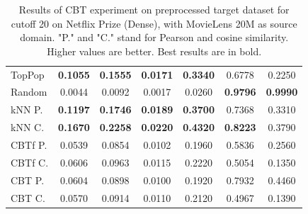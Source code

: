 \begin{table}[hbt]
\begin{tabulary}{\textwidth}{|L|CCCCCC|}
TopPop & \textbf{0.1055} & \textbf{0.1555} & \textbf{0.0171} & \textbf{0.3340} & 0.6778 & 0.2250 \\
Random & 0.0044 & 0.0092 & 0.0017 & 0.0260 & \textbf{0.9796} & \textbf{0.9990} \\
kNN P. & \textbf{0.1197} & \textbf{0.1746} & \textbf{0.0189} & \textbf{0.3700} & 0.7368 & 0.3310 \\
kNN C. & \textbf{0.1670} & \textbf{0.2258} & \textbf{0.0220} & \textbf{0.4320} & \textbf{0.8223} & 0.3790 \\
CBTf P. & 0.0539 & 0.0854 & 0.0102 & 0.1960 & 0.5836 & 0.2560 \\
CBTf C. & 0.0606 & 0.0963 & 0.0115 & 0.2220 & 0.5054 & 0.1350 \\
CBT P. & 0.0604 & 0.0898 & 0.0100 & 0.1920 & 0.7932 & 0.4460 \\
CBT C. & 0.0570 & 0.0914 & 0.0110 & 0.2120 & 0.4967 & 0.1390 \\
\hline
\end{tabulary}
\caption{Results of CBT experiment on preprocessed target dataset for cutoff 20 on Netflix Prize (Dense), with MovieLens 20M as source domain. "P." and "C." stand for Pearson and cosine similarity. Higher values are better. Best results are in bold.}
\end{table}

